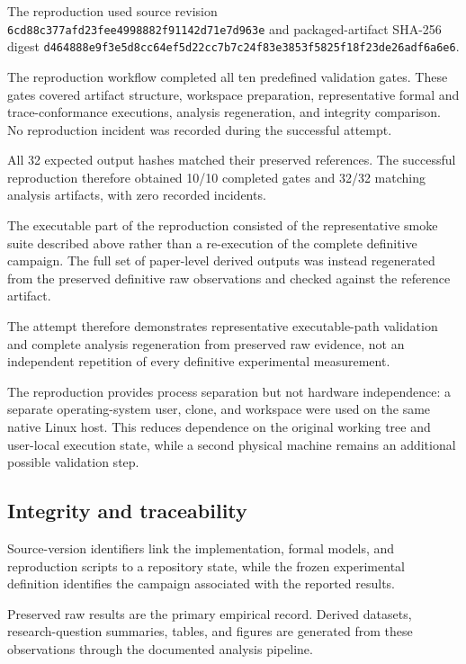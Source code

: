 The reproduction used source revision
\texttt{6cd88c37\allowbreak 7afd23fe\allowbreak e4998882\allowbreak f91142d7\allowbreak 1e7d963e}
and packaged-artifact SHA-256 digest
\texttt{d464888e\allowbreak 9f3e5d8c\allowbreak c64ef5d2\allowbreak 2cc7b7c2\allowbreak 4f83e385\allowbreak 3f5825f1\allowbreak 8f23de26\allowbreak adf6a6e6}.

The reproduction workflow completed all ten predefined validation gates.
These gates covered artifact structure, workspace preparation,
representative formal and trace-conformance executions, analysis
regeneration, and integrity comparison. No reproduction incident was
recorded during the successful attempt.

All 32 expected output hashes matched their preserved references. The
successful reproduction therefore obtained 10/10 completed gates and 32/32
matching analysis artifacts, with zero recorded incidents.

The executable part of the reproduction consisted of the representative
smoke suite described above rather than a re-execution of the complete
definitive campaign. The full set of paper-level derived outputs was
instead regenerated from the preserved definitive raw observations and
checked against the reference artifact.

The attempt therefore demonstrates representative executable-path validation
and complete analysis regeneration from preserved raw evidence, not an
independent repetition of every definitive experimental measurement.

The reproduction provides process separation but not hardware independence:
a separate operating-system user, clone, and workspace were used on the same
native Linux host. This reduces dependence on the original working tree and
user-local execution state, while a second physical machine remains an
additional possible validation step.

\subsection{Integrity and traceability}
\label{subsec:artifact-integrity}

Source-version identifiers link the implementation, formal models, and
reproduction scripts to a repository state, while the frozen experimental
definition identifies the campaign associated with the reported results.

Preserved raw results are the primary empirical record. Derived datasets,
research-question summaries, tables, and figures are generated from these
observations through the documented analysis pipeline.

